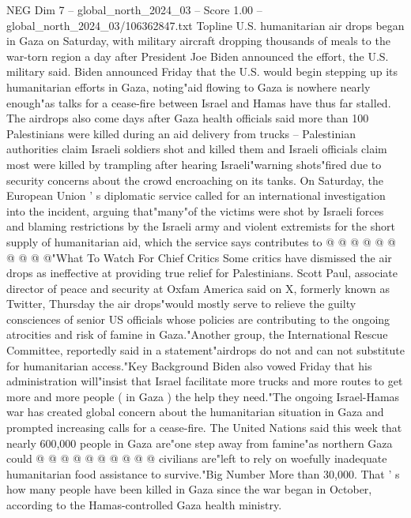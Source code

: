 \begin{textsample}{NEG Dim 7 – global\_north\_2024\_03 – Score 1.00 – global\_north\_2024\_03/106362847.txt}  \label{ex:f7_neg_424}
Topline U.S. humanitarian air drops began in Gaza on Saturday, with military aircraft dropping thousands of meals to the war-torn region a day after President Joe Biden announced the effort, the U.S. military said.
Biden announced Friday that the U.S. would begin stepping up its humanitarian efforts in Gaza, noting"aid flowing to Gaza is nowhere nearly enough"as talks for a cease-fire between Israel and Hamas have thus far stalled.
The airdrops also come days after Gaza health officials said more than 100 Palestinians were killed during an aid delivery from trucks -- Palestinian authorities claim Israeli soldiers shot and killed them and Israeli officials claim most were killed by trampling after hearing Israeli"warning shots"fired due to security concerns about the crowd encroaching on its tanks.
On Saturday, the European Union ' s diplomatic service called for an international investigation into the incident, arguing that"many"of the victims were shot by Israeli forces and blaming restrictions by the Israeli army and violent extremists for the short supply of humanitarian aid, which the service says contributes to @ @ @ @ @ @ @ @ @ @"What To Watch For Chief Critics Some critics have dismissed the air drops as ineffective at providing true relief for Palestinians.
Scott Paul, associate director of peace and security at Oxfam America said on X, formerly known as Twitter, Thursday the air drops"would mostly serve to relieve the guilty consciences of senior US officials whose policies are contributing to the ongoing atrocities and risk of famine in Gaza."Another group, the International Rescue Committee, reportedly said in a statement"airdrops do not and can not substitute for humanitarian access."Key Background Biden also vowed Friday that his administration will"insist that Israel facilitate more trucks and more routes to get more and more people ( in Gaza ) the help they need."The ongoing Israel-Hamas war has created global concern about the humanitarian situation in Gaza and prompted increasing calls for a cease-fire.
The United Nations said this week that nearly 600,000 people in Gaza are"one step away from famine"as northern Gaza could @ @ @ @ @ @ @ @ @ @ civilians are"left to rely on woefully inadequate humanitarian food assistance to survive."Big Number More than 30,000.
That ' s how many people have been killed in Gaza since the war began in October, according to the Hamas-controlled Gaza health ministry.

\end{textsample}
